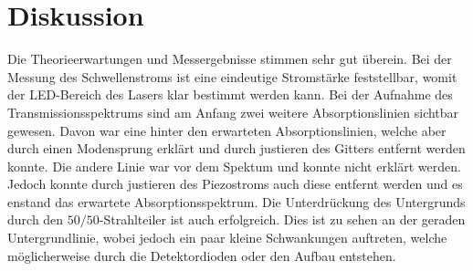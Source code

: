 \section{Diskussion}
\label{sec:Diskussion}
Die Theorieerwartungen und Messergebnisse stimmen sehr gut überein.
Bei der Messung des Schwellenstroms ist eine eindeutige
Stromstärke feststellbar, womit der LED-Bereich des Lasers klar bestimmt werden kann.
Bei der Aufnahme des Transmissionsspektrums sind am Anfang zwei weitere Absorptionslinien sichtbar gewesen.
Davon war eine hinter den erwarteten Absorptionslinien, welche aber durch
einen Modensprung erklärt und durch justieren des Gitters entfernt werden konnte.
Die andere Linie war vor dem Spektum und konnte nicht erklärt werden. Jedoch
konnte durch justieren des Piezostroms auch diese entfernt werden und es enstand das erwartete Absorptionsspektrum.
Die Unterdrückung des Untergrunds durch den $50 / 50 $-Strahlteiler ist auch erfolgreich.
Dies ist zu sehen an der geraden Untergrundlinie, wobei jedoch ein paar kleine Schwankungen auftreten, welche möglicherweise
durch die Detektordioden oder den Aufbau entstehen.
